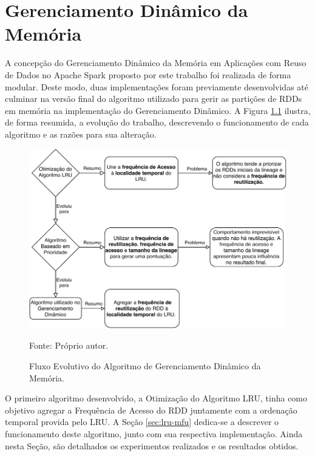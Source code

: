 \chapter{Gerenciamento Dinâmico da Memória} \label{cap:implementacoes}
A concepção do Gerenciamento Dinâmico da Memória em Aplicações com Reuso de Dados no Apache Spark proposto por este trabalho foi realizada de forma modular. Deste modo, duas implementações foram previamente desenvolvidas até culminar na versão final do algoritmo utilizado para gerir as partições de RDDs em memória na implementação do Gerenciamento Dinâmico. A Figura \ref{fig:fluxo-evolucao-trabalho} ilustra, de forma resumida, a evolução do trabalho, descrevendo o funcionamento de cada algoritmo e as razões para sua alteração.

\begin{figure}[!ht]
    \caption{Fluxo Evolutivo do Algoritmo de Gerenciamento Dinâmico da Memória.}
    \begin{center}
        \includegraphics[scale=1]{imagens/fluxo-evolucao-trabalho.pdf}
    \end{center}
    \small{Fonte: Próprio autor.}
    \label{fig:fluxo-evolucao-trabalho}
\end{figure}

O primeiro algoritmo desenvolvido, a Otimização do Algoritmo LRU, tinha como objetivo agregar a Frequência de Acesso do RDD juntamente com a ordenação temporal provida pelo LRU. A Seção \ref{sec:lru-mfu} dedica-se a descrever o funcionamento deste algoritmo, junto com sua respectiva implementação. Ainda nesta Seção, são detalhados os experimentos realizados e os resultados obtidos.

